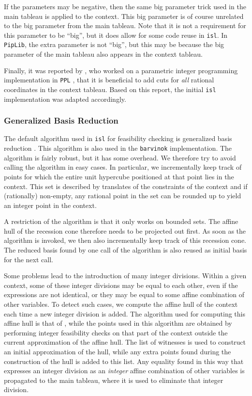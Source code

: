 If the parameters may be negative, then the same big parameter trick
used in the main tableau is applied to the context.  This big parameter
is of course unrelated to the big parameter from the main tableau.
Note that it is not a requirement for this parameter to be ``big'',
but it does allow for some code reuse in {\tt isl}.
In {\tt PipLib}, the extra parameter is not ``big'', but this may be because
the big parameter of the main tableau also appears
in the context tableau.

Finally, it was reported by , who
worked on a parametric integer programming implementation
in {\tt PPL} ,
that it is beneficial to add cuts for \emph{all} rational coordinates
in the context tableau.  Based on this report,
the initial {\tt isl} implementation was adapted accordingly.

\subsubsection{Generalized Basis Reduction}\label{s:GBR}

The default algorithm used in {\tt isl} for feasibility checking
is generalized basis reduction .
This algorithm is also used in the {\tt barvinok} implementation.
The algorithm is fairly robust, but it has some overhead.
We therefore try to avoid calling the algorithm in easy cases.
In particular, we incrementally keep track of points for which
the entire unit hypercube positioned at that point lies in the context.
This set is described by translates of the constraints of the context
and if (rationally) non-empty, any rational point
in the set can be rounded up to yield an integer point in the context.

A restriction of the algorithm is that it only works on bounded sets.
The affine hull of the recession cone therefore needs to be projected
out first.  As soon as the algorithm is invoked, we then also
incrementally keep track of this recession cone.  The reduced basis
found by one call of the algorithm is also reused as initial basis
for the next call.

Some problems lead to the
introduction of many integer divisions.  Within a given context,
some of these integer divisions may be equal to each other, even
if the expressions are not identical, or they may be equal to some
affine combination of other variables.
To detect such cases, we compute the affine hull of the context
each time a new integer division is added.  The algorithm used
for computing this affine hull is that of ,
while the points used in this algorithm are obtained by performing
integer feasibility checks on that part of the context outside
the current approximation of the affine hull.
The list of witnesses is used to construct an initial approximation
of the hull, while any extra points found during the construction
of the hull is added to this list.
Any equality found in this way that expresses an integer division
as an \emph{integer} affine combination of other variables is
propagated to the main tableau, where it is used to eliminate that
integer division.

